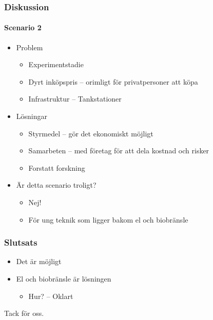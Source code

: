 \documentclass{beamer}
\begin{document}
\begin{frame}
	\frametitle{Diskussion}
	\framesubtitle{Scenario 2}
	\begin{itemize}
		\item Problem
			\begin{itemize}
				\item Experimentstadie
				\item Dyrt inköpspris -- orimligt för privatpersoner att köpa
				\item Infrastruktur -- Tankstationer
			\end{itemize}
		\pause
		\item Lösningar
			\begin{itemize}
				\item Styrmedel -- gör det ekonomiskt möjligt
				\item Samarbeten -- med företag för att dela kostnad och risker
				\item Forstatt forskning
			\end{itemize}
		\pause
		\item Är detta scenario troligt?
			\begin{itemize}
				\item Nej!
				\item För ung teknik som ligger bakom el och biobränsle
			\end{itemize}
	\end{itemize}
\end{frame}

\begin{frame}
	\frametitle{Slutsats}
	\begin{itemize}
		\item Det är möjligt
		\item El och biobränsle är lösningen
			\begin{itemize}
				\item Hur? -- Oklart
			\end{itemize}
	\end{itemize}
	\vfill
	Tack för oss.
\end{frame}
\end{document}
